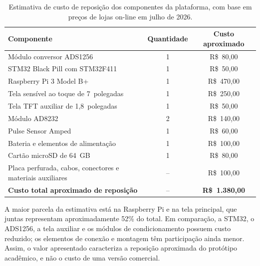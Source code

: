 \documentclass[a4paper,12pt]{fcte}
\begin{document}
\begin{table}[!htbp]
    \centering
    \caption{Estimativa de custo de reposição dos componentes da plataforma, com base em preços de lojas on-line em julho de 2026.}
    \label{tab:custo_plataforma}
    \small
    \begin{tabular}{p{7.0cm} c c}
        \hline
        \textbf{Componente} &
        \textbf{Quantidade} &
        \textbf{Custo aproximado} \\
        \hline

        Módulo conversor ADS1256 &
        1 &
        R\$~80,00 \\

        STM32 Black Pill com STM32F411 &
        1 &
        R\$~50,00 \\

        Raspberry Pi 3 Model B+ &
        1 &
        R\$~470,00 \\

        Tela sensível ao toque de 7~polegadas &
        1 &
        R\$~250,00 \\

        Tela TFT auxiliar de 1,8~polegadas &
        1 &
        R\$~50,00 \\

        Módulo AD8232 &
        2 &
        R\$~140,00 \\

        Pulse Sensor Amped &
        1 &
        R\$~60,00 \\

        Bateria e elementos de alimentação &
        1 &
        R\$~100,00 \\

        Cartão microSD de 64~GB &
        1 &
        R\$~80,00 \\

        Placa perfurada, cabos, conectores e materiais auxiliares &
        -- &
        R\$~100,00 \\

        \hline
        \textbf{Custo total aproximado de reposição} &
        -- &
        \textbf{R\$~1.380,00} \\
        \hline
    \end{tabular}
\end{table}

A maior parcela da estimativa está na Raspberry Pi e na tela principal, que juntas representam aproximadamente 52\% do total. Em comparação, a STM32, o ADS1256, a tela auxiliar e os módulos de condicionamento possuem custo reduzido; os elementos de conexão e montagem têm participação ainda menor. Assim, o valor apresentado caracteriza a reposição aproximada do protótipo acadêmico, e não o custo de uma versão comercial.
\end{document}
